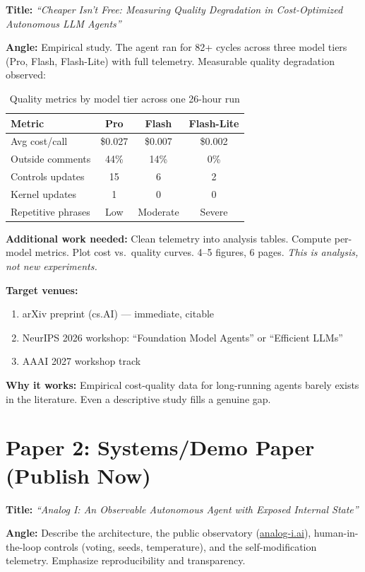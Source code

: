 \documentclass[11pt,letterpaper]{article}
\begin{document}
\textbf{Title:} \textit{``Cheaper Isn't Free: Measuring Quality Degradation in Cost-Optimized Autonomous LLM Agents''}

\textbf{Angle:} Empirical study. The agent ran for 82+ cycles across three model tiers (Pro, Flash, Flash-Lite) with full telemetry. Measurable quality degradation observed:

\begin{table}[h]
\centering
\begin{tabular}{lccc}
\toprule
\textbf{Metric} & \textbf{Pro} & \textbf{Flash} & \textbf{Flash-Lite} \\
\midrule
Avg cost/call & \$0.027 & \$0.007 & \$0.002 \\
Outside comments & 44\% & 14\% & 0\% \\
Controls updates & 15 & 6 & 2 \\
Kernel updates & 1 & 0 & 0 \\
Repetitive phrases & Low & Moderate & Severe \\
\bottomrule
\end{tabular}
\caption{Quality metrics by model tier across one 26-hour run}
\end{table}

\textbf{Additional work needed:} Clean telemetry into analysis tables. Compute per-model metrics. Plot cost vs.\ quality curves. 4--5 figures, 6 pages. \textit{This is analysis, not new experiments.}

\textbf{Target venues:}
\begin{enumerate}
\item arXiv preprint (cs.AI) --- immediate, citable
\item NeurIPS 2026 workshop: ``Foundation Model Agents'' or ``Efficient LLMs''
\item AAAI 2027 workshop track
\end{enumerate}

\textbf{Why it works:} Empirical cost-quality data for long-running agents barely exists in the literature. Even a descriptive study fills a genuine gap.

\section{Paper 2: Systems/Demo Paper (Publish Now)}

\textbf{Title:} \textit{``Analog I: An Observable Autonomous Agent with Exposed Internal State''}

\textbf{Angle:} Describe the architecture, the public observatory (\url{analog-i.ai}), human-in-the-loop controls (voting, seeds, temperature), and the self-modification telemetry. Emphasize reproducibility and transparency.
\end{document}
